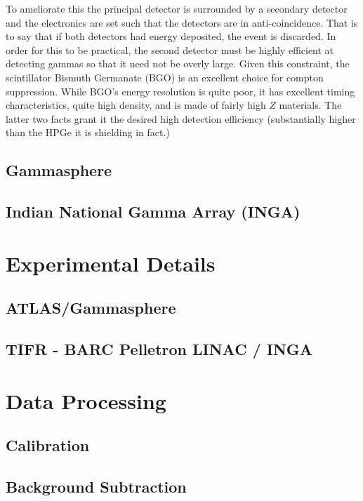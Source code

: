 To ameliorate this the principal detector is surrounded by a secondary detector and the electronics are set such that the detectors are in anti-coincidence. That is to say that if both detectors had energy deposited, the event is discarded. In order for this to be practical, the second detector must be highly efficient at detecting gammas so that it need not be overly large. Given this constraint, the scintillator Bismuth Germanate (BGO) is an excellent choice for compton suppression. While BGO's energy resolution is quite poor, it has excellent timing characteristics, quite high density, and is made of fairly high $Z$ materials. The latter two facts grant it the desired high detection efficiency (substantially higher than the HPGe it is shielding in fact.)
\subsection{Gammasphere}
\label{ssec:exp-pr-gamma-gammasphere}
\subsection{Indian National Gamma Array (INGA)}
\label{ssec:exp-pr-gamma-spec-inga}

\section{Experimental Details}
\label{sec:exp-pr-details}
\subsection{ATLAS/Gammasphere}
\label{ssec:exp-pr-details-gs}
\subsection{TIFR - BARC Pelletron LINAC / INGA}
\label{ssec:exp-pr-details-inga}

\section{Data Processing}
\label{sec:exp-pr-data-proc}
\subsection{Calibration}
\label{ssec:exp-pr-data-proc-cal}
\subsection{Background Subtraction}
\label{ssec:exp-pr-data-proc-bg-sub}
